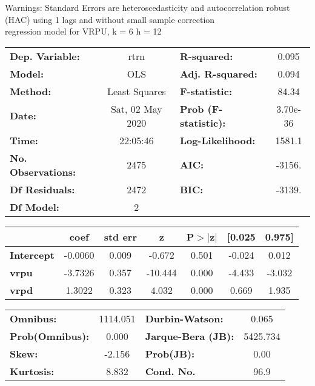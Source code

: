 Warnings: \newline
 [1] Standard Errors are heteroscedasticity and autocorrelation robust (HAC) using 1 lags and without small sample correction\\ 

regression model for VRPU, k = 6 h = 12\begin{center}
\begin{tabular}{lclc}
\toprule
\textbf{Dep. Variable:}    &       rtrn       & \textbf{  R-squared:         } &     0.095   \\
\textbf{Model:}            &       OLS        & \textbf{  Adj. R-squared:    } &     0.094   \\
\textbf{Method:}           &  Least Squares   & \textbf{  F-statistic:       } &     84.34   \\
\textbf{Date:}             & Sat, 02 May 2020 & \textbf{  Prob (F-statistic):} &  3.70e-36   \\
\textbf{Time:}             &     22:05:46     & \textbf{  Log-Likelihood:    } &    1581.1   \\
\textbf{No. Observations:} &        2475      & \textbf{  AIC:               } &    -3156.   \\
\textbf{Df Residuals:}     &        2472      & \textbf{  BIC:               } &    -3139.   \\
\textbf{Df Model:}         &           2      & \textbf{                     } &             \\
\bottomrule
\end{tabular}
\begin{tabular}{lcccccc}
                   & \textbf{coef} & \textbf{std err} & \textbf{z} & \textbf{P$> |$z$|$} & \textbf{[0.025} & \textbf{0.975]}  \\
\midrule
\textbf{Intercept} &      -0.0060  &        0.009     &    -0.672  &         0.501        &       -0.024    &        0.012     \\
\textbf{vrpu}      &      -3.7326  &        0.357     &   -10.444  &         0.000        &       -4.433    &       -3.032     \\
\textbf{vrpd}      &       1.3022  &        0.323     &     4.032  &         0.000        &        0.669    &        1.935     \\
\bottomrule
\end{tabular}
\begin{tabular}{lclc}
\textbf{Omnibus:}       & 1114.051 & \textbf{  Durbin-Watson:     } &    0.065  \\
\textbf{Prob(Omnibus):} &   0.000  & \textbf{  Jarque-Bera (JB):  } & 5425.734  \\
\textbf{Skew:}          &  -2.156  & \textbf{  Prob(JB):          } &     0.00  \\
\textbf{Kurtosis:}      &   8.832  & \textbf{  Cond. No.          } &     96.9  \\
\bottomrule
\end{tabular}
\end{center}

